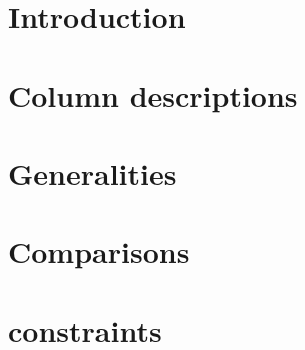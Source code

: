 
\section{Introduction}                   \label{rlp auth: intro}                           
\section{Column descriptions}            \label{rlp auth: column descriptions}             
\section{Generalities}                   \label{rlp auth: generalities}                    
\section{Comparisons}                    \label{rlp auth: comparisons}                     
\section{\rlpUtilsMod{} constraints}     \label{rlp auth: rlp utils}                       
